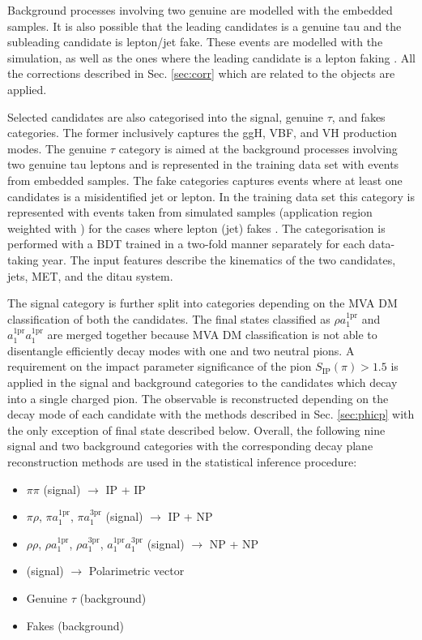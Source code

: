 Background processes involving two genuine \tauh are modelled with the embedded samples. It is also possible that the leading \tauh candidates is a genuine tau and the subleading \tauh candidate is lepton/jet fake. These events are modelled with the simulation, as well as the ones where the leading \tauh candidate is a lepton faking \tauh. All the corrections described in Sec. \ref{sec:corr} which are related to the \tauh objects are applied.

Selected \tata candidates are also categorised into the signal, genuine $\tau$, and fakes categories. The former inclusively captures the ggH, VBF, and VH production modes. The genuine $\tau$ category is aimed at the background processes involving two genuine tau leptons and is represented in the training data set with events from embedded samples. The fake categories captures events where at least one \tauh candidates is a misidentified jet or lepton. In the training data set this category is represented  with events taken from simulated samples (application region weighted with \ff) for the cases where lepton (jet) fakes \tauh. The categorisation is performed with a BDT trained in a two-fold manner separately for each data-taking year. The input features describe the kinematics of the two \tauh candidates, jets, MET, and the ditau system. 

The signal category is further split into categories depending on the MVA DM classification of both the \tauh candidates. The final states classified as $\rho a_1^\text{1pr}$ and $a_1^\text{1pr} a_1^\text{1pr}$ are merged together because MVA DM classification is not able to disentangle efficiently decay modes with one and two neutral pions. A requirement on the impact parameter significance of the pion $S_\text{IP}(\pi) > 1.5$ is applied in the signal and background categories to the \tauh candidates which decay into a single charged pion. The \phicp observable is reconstructed depending on the decay mode of each \tauh candidate with the methods described in Sec. \ref{sec:phicp} with the only exception of \aaa final state described below. Overall, the following nine signal and two background categories with the corresponding decay plane reconstruction methods are used in the statistical inference procedure:

\begin{itemize}
    \item $\pi\pi$ (signal) $\longrightarrow$ IP + IP
    \item $\pi\rho$, $\pi a_1^\text{1pr}$, $\pi a_1^\text{3pr}$ (signal) $\longrightarrow$ IP + NP
    \item $\rho \rho$, $\rho a_1^\text{1pr}$, $\rho a_1^\text{3pr}$, $a_1^\text{1pr} a_1^\text{3pr}$ (signal) $\longrightarrow$ NP + NP
    \item \aaa (signal) $\longrightarrow$ Polarimetric vector
    \item Genuine $\tau$ (background)
    \item Fakes (background)
\end{itemize}

